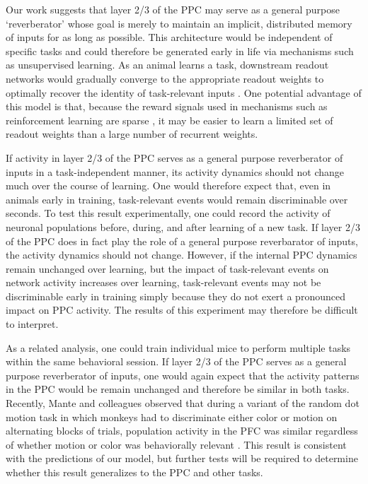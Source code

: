 Our work suggests that layer 2/3 of the PPC may serve as a general purpose `reverberator' whose goal is merely to maintain an implicit, distributed memory of inputs for as long as possible. This architecture would be independent of specific tasks and could therefore be generated early in life via mechanisms such as unsupervised learning. As an animal learns a task, downstream readout networks would gradually converge to the appropriate readout weights to optimally recover the identity of task-relevant inputs \citep{Legenstein:2008gx, Gutig:2006cz, Jaeger:2004hj, Sussillo:2009gh, Barak:2013bg, Sussillo:2014dy, Hoerzer:2014cz}. One potential advantage of this model is that, because the reward signals used in mechanisms such as reinforcement learning are sparse \citep{Sutton:2011wc}, it may be easier to learn a limited set of readout weights than a large number of recurrent weights.

\bigskip
If activity in layer 2/3 of the PPC serves as a general purpose reverberator of inputs in a task-independent manner, its activity dynamics should not change much over the course of learning. One would therefore expect that, even in animals early in training, task-relevant events would remain discriminable over seconds. To test this result experimentally, one could record the activity of neuronal populations before, during, and after learning of a new task. If layer 2/3 of the PPC does in fact play the role of a general purpose reverbarator of inputs, the activity dynamics should not change. However, if the internal PPC dynamics remain unchanged over learning, but the impact of task-relevant events on network activity increases over learning, task-relevant events may not be discriminable early in training simply because they do not exert a pronounced impact on PPC activity. The results of this experiment may therefore be difficult to interpret. 

\bigskip
As a related analysis, one could train individual mice to perform multiple tasks within the same behavioral session. If layer 2/3 of the PPC serves as a general purpose reverberator of inputs, one would again expect that the activity patterns in the PPC would be remain unchanged and therefore be similar in both tasks. Recently, Mante and colleagues observed that during a variant of the random dot motion task in which monkeys had to discriminate either color or motion on alternating blocks of trials, population activity in the PFC was similar regardless of whether motion or color was behaviorally relevant \citep{Mante:2013ie}. This result is consistent with the predictions of our model, but further tests will be required to determine whether this result generalizes to the PPC and other tasks.

